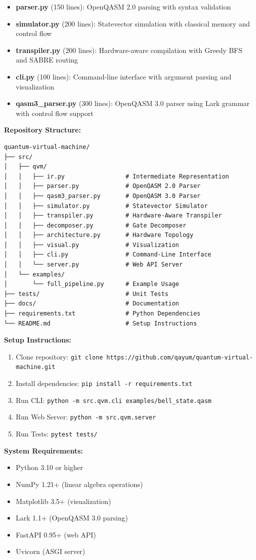 \begin{itemize}
\item \textbf{parser.py} (150 lines): OpenQASM 2.0 parsing with syntax validation
\item \textbf{simulator.py} (200 lines): Statevector simulation with classical memory and control flow
\item \textbf{transpiler.py} (200 lines): Hardware-aware compilation with Greedy BFS and SABRE routing
\item \textbf{cli.py} (100 lines): Command-line interface with argument parsing and visualization
\item \textbf{qasm3\_parser.py} (300 lines): OpenQASM 3.0 parser using Lark grammar with control flow support
\end{itemize}

\vspace{1cm}

\textbf{Repository Structure:}
\begin{verbatim}
quantum-virtual-machine/
├── src/
│   ├── qvm/
│   │   ├── ir.py                 # Intermediate Representation
│   │   ├── parser.py             # OpenQASM 2.0 Parser
│   │   ├── qasm3_parser.py       # OpenQASM 3.0 Parser
│   │   ├── simulator.py          # Statevector Simulator
│   │   ├── transpiler.py         # Hardware-Aware Transpiler
│   │   ├── decomposer.py         # Gate Decomposer
│   │   ├── architecture.py       # Hardware Topology
│   │   ├── visual.py             # Visualization
│   │   ├── cli.py                # Command-Line Interface
│   │   └── server.py             # Web API Server
│   └── examples/
│       └── full_pipeline.py      # Example Usage
├── tests/                        # Unit Tests
├── docs/                         # Documentation
├── requirements.txt              # Python Dependencies
└── README.md                     # Setup Instructions
\end{verbatim}

\vspace{0.5cm}

\textbf{Setup Instructions:}
\begin{enumerate}
\item Clone repository: \texttt{git clone https://github.com/qayum/quantum-virtual-machine.git}
\item Install dependencies: \texttt{pip install -r requirements.txt}
\item Run CLI: \texttt{python -m src.qvm.cli examples/bell\_state.qasm}
\item Run Web Server: \texttt{python -m src.qvm.server}
\item Run Tests: \texttt{pytest tests/}
\end{enumerate}

\vspace{0.5cm}

\textbf{System Requirements:}
\begin{itemize}
\item Python 3.10 or higher
\item NumPy 1.21+ (linear algebra operations)
\item Matplotlib 3.5+ (visualization)
\item Lark 1.1+ (OpenQASM 3.0 parsing)
\item FastAPI 0.95+ (web API)
\item Uvicorn (ASGI server)
\end{itemize}

